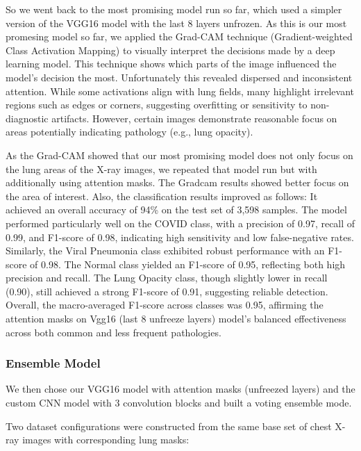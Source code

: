 \documentclass{article}
\begin{document}
So we went back to the most promising model run so far, which used a simpler version of the VGG16 model with the last 8 layers unfrozen. As this is our most promesing model so far, we applied the Grad-CAM technique (Gradient-weighted Class Activation Mapping) to visually interpret the decisions made by a deep learning model. This technique shows which parts of the image influenced the model’s decision the most. Unfortunately this revealed dispersed and inconsistent attention. While some activations align with lung fields, many highlight irrelevant regions such as edges or corners, suggesting overfitting or sensitivity to non-diagnostic artifacts. However, certain images demonstrate reasonable focus on areas potentially indicating pathology (e.g., lung opacity).

As the Grad-CAM showed that our most promising model does not only focus on the lung areas of the X-ray images, we repeated that model run but with additionally using attention masks. The Gradcam results showed better focus on the area of interest. Also, the classification results improved as follows: It achieved an overall accuracy of 94\% on the test set of 3,598 samples. The model performed particularly well on the COVID class, with a precision of 0.97, recall of 0.99, and F1-score of 0.98, indicating high sensitivity and low false-negative rates. Similarly, the Viral Pneumonia class exhibited robust performance with an F1-score of 0.98. The Normal class yielded an F1-score of 0.95, reflecting both high precision and recall. The Lung Opacity class, though slightly lower in recall (0.90), still achieved a strong F1-score of 0.91, suggesting reliable detection. Overall, the macro-averaged F1-score across classes was 0.95, affirming the attention masks on Vgg16 (last 8 unfreeze layers) model’s balanced effectiveness across both common and less frequent pathologies.



\subsubsection {Ensemble Model} 
We then chose our VGG16 model with attention masks (unfreezed layers) and the custom CNN model with 3 convolution blocks and built a voting ensemble mode.

Two dataset configurations were constructed from the same base set of chest X-ray images with corresponding lung masks:
\end{document}
